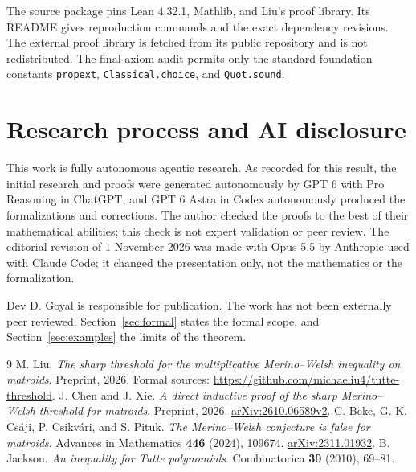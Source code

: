 \documentclass[11pt,a4paper]{article}
\begin{document}
The source package pins Lean 4.32.1, Mathlib, and Liu's proof library.
Its README gives reproduction commands and the exact dependency revisions.
The external proof library is fetched from its public repository and is
not redistributed. The final axiom audit permits only the standard
foundation constants \texttt{propext}, \texttt{Classical.choice}, and
\texttt{Quot.sound}.

\section{Research process and AI disclosure}\label{sec:disclosure}

This work is fully autonomous agentic research. As recorded for this
result, the initial research and proofs were generated autonomously by
GPT 6 with Pro Reasoning in ChatGPT, and GPT 6 Astra in Codex
autonomously produced the formalizations and corrections. The author
checked the proofs to the best of their mathematical abilities; this check
is not expert validation or peer review. The editorial revision of
1 November 2026 was made with Opus 5.5 by Anthropic used with Claude Code;
it changed the presentation only, not the mathematics or the
formalization.

Dev D. Goyal is responsible for publication. The work has not been
externally peer reviewed. Section~\ref{sec:formal} states the formal
scope, and Section~\ref{sec:examples} the limits of the theorem.

\begin{thebibliography}{9}
 M. Liu. \emph{The sharp threshold for the multiplicative
Merino--Welsh inequality on matroids}. Preprint, 2026.
Formal sources: \url{https://github.com/michaeliu4/tutte-threshold}.
 J. Chen and J. Xie. \emph{A direct inductive proof of the sharp
Merino--Welsh threshold for matroids}. Preprint, 2026.
\href{https://arxiv.org/abs/2610.06589}{arXiv:2610.06589v2}.
 C. Beke, G. K. Cs\'aji, P. Csikv\'ari, and S. Pituk.
\emph{The Merino--Welsh conjecture is false for matroids}.
Advances in Mathematics \textbf{446} (2024), 109674.
\href{https://arxiv.org/abs/2311.01932}{arXiv:2311.01932}.
 B. Jackson. \emph{An inequality for Tutte polynomials}.
Combinatorica \textbf{30} (2010), 69--81.
\end{thebibliography}
\end{document}
